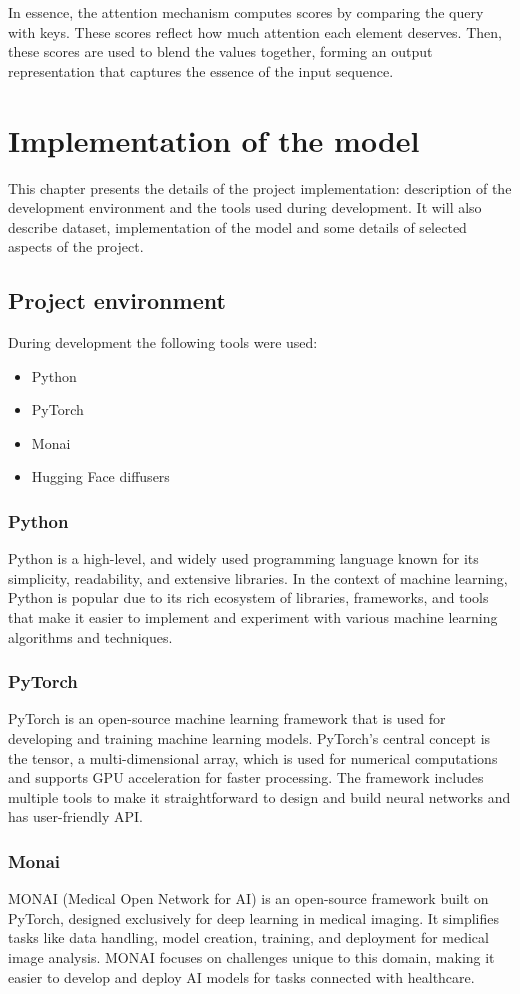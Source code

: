 \documentclass[11pt,a4paper]{report}
\begin{document}
In essence, the attention mechanism computes scores by comparing the query with keys. These scores reflect how much attention each element deserves. Then, these scores are used to blend the values together, forming an output representation that captures the essence of the input sequence. \cite{AttentionIsAll} \cite{AttentionWiki} \cite{TransformersWiki}

\chapter{Implementation of the model}
This chapter presents the details of the project implementation: description of the development environment and the tools used during development. It will also describe dataset, implementation of the model and some details of selected aspects of the project.
\section{Project environment}
During development the following tools were used:
\begin{itemize}
\item Python 
\item PyTorch
\item Monai
\item Hugging Face diffusers 
\end{itemize}
\subsection{Python}
Python is a high-level, and widely used programming language known for its simplicity, readability, and extensive libraries. In the context of machine learning, Python is popular due to its rich ecosystem of libraries, frameworks, and tools that make it easier to implement and experiment with various machine learning algorithms and techniques. \cite{Python}
\subsection{PyTorch}
PyTorch is an open-source machine learning framework that is used for developing and training machine learning models. PyTorch's central concept is the tensor, a multi-dimensional array, which is used for numerical computations and supports GPU acceleration for faster processing. The framework includes multiple tools to make it straightforward to design and build neural networks and has user-friendly API. \cite{Pytorch}
\subsection{Monai}
MONAI (Medical Open Network for AI) is an open-source framework built on PyTorch, designed exclusively for deep learning in medical imaging. It simplifies tasks like data handling, model creation, training, and deployment for medical image analysis. MONAI focuses on challenges unique to this domain, making it easier to develop and deploy AI models for tasks connected with healthcare. \cite{Monai}
\end{document}
